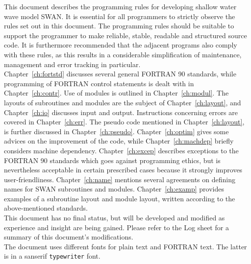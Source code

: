 \documentclass[12pt]{book}
\begin{document}
\tableofcontents

 \label{ch:intro}

This document describes the programming rules for developing shallow water wave model SWAN.
It is essential for all programmers to strictly observe the rules set out in this document.
The programming rules should be suitable to support the programmer to make reliable, stable,
readable and structured source code.
It is furthermore recommended that the adjacent programs also comply with these rules, as this
results in a considerable simplification of maintenance, management and error tracking in particular.
\\[2ex]
\noindent
Chapter~\ref{ch:fortstd} discusses several general FORTRAN 90 standards, while programming of FORTRAN
control statements is dealt with in Chapter~\ref{ch:contr}.
Use of modules is outlined in Chapter~\ref{ch:modul}. The layouts of subroutines and modules are
the subject of Chapter~\ref{ch:layout}, and Chapter~\ref{ch:io} discusses input and output. Instructions
concerning errors are covered in Chapter~\ref{ch:err}. The pseudo code mentioned in Chapter~\ref{ch:layout},
is further discussed in Chapter~\ref{ch:pseudo}. Chapter~\ref{ch:optim} gives some advices on the improvement
of the code, while Chapter~\ref{ch:machdep} briefly considers machine
dependency. Chapter~\ref{ch:excep} describes exceptions to the FORTRAN 90 standards which goes against
programming ethics, but is nevertheless acceptable in certain prescribed cases because it strongly improves
user-friendliness. Chapter~\ref{ch:name} mentions several agreements on defining names for SWAN
subroutines and modules. Chapter~\ref{ch:examp} provides examples of a subroutine layout and module layout,
written according to the above-mentioned standards.
\\[2ex]
\noindent
This document has no final status, but will be developed and modified as experience and insight
are being gained. Please refer to the Log sheet for a summary of this document's modifications.
\\[2ex]
\noindent
The document uses different fonts for plain text and FORTRAN text.
The latter is in a sanserif {\tt typewriter} font.

 \label{ch:fortstd}
\end{document}

